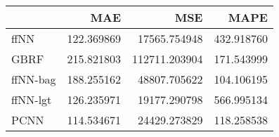 \begin{tabular}{lrrr}
\toprule
{} &         MAE &            MSE &        MAPE \\
\midrule
ffNN     &  122.369869 &   17565.754948 &  432.918760 \\
GBRF     &  215.821803 &  112711.203904 &  171.543999 \\
ffNN-bag &  188.255162 &   48807.705622 &  104.106195 \\
ffNN-lgt &  126.235971 &   19177.290798 &  566.995134 \\
PCNN     &  114.534671 &   24429.273829 &  118.258538 \\
\bottomrule
\end{tabular}

